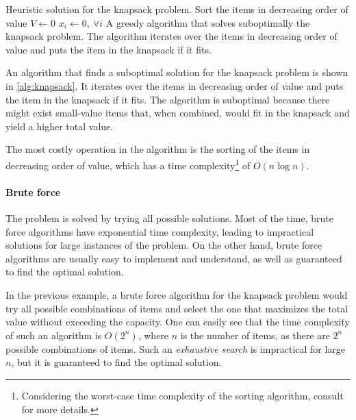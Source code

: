 \begin{algobox}[label=alg:knapsack]{Heuristic solution for the knapsack problem.}
  Sort the items in decreasing order of value\;
  $V \gets 0$\;
  $x_i \gets 0,~\forall i$\;
  \tcblower
  A greedy algorithm that solves suboptimally the knapsack problem.  The algorithm iterates over
  the items in decreasing order of value and puts the item in the knapsack if it fits.
\end{algobox}

An algorithm that finds a suboptimal solution for the knapsack problem is shown in
\cref{alg:knapsack}.
It iterates over the items in decreasing order of value and puts the item in the
knapsack if it fits.  The algorithm is suboptimal because there might exist small-value
items that, when combined, would fit in the knapsack and yield a higher total value.

The most costly operation in the algorithm is the sorting of the items in
decreasing order of value, which has a time complexity\footnote{%
Considering the worst-case time complexity of the sorting algorithm, consult
 for more details.} of $O(n \log n)$.

\paragraph{Brute force}  The problem is solved by trying all possible solutions.  Most of
the time, brute force algorithms have exponential time complexity, leading to impractical
solutions for large instances of the problem.  On the other hand, brute force algorithms
are usually easy to implement and understand, as well as guaranteed to find the optimal
solution.

In the previous example, a brute force algorithm for the knapsack problem would
try all possible combinations of items and select the one that maximizes the total value
without exceeding the capacity.  One can easily see that the time complexity of such an
algorithm is $O(2^n)$, where $n$ is the number of items, as there are $2^n$ possible
combinations of items.  Such an \emph{exhaustive search} is impractical for large $n$,
but it is guaranteed to find the optimal solution.

